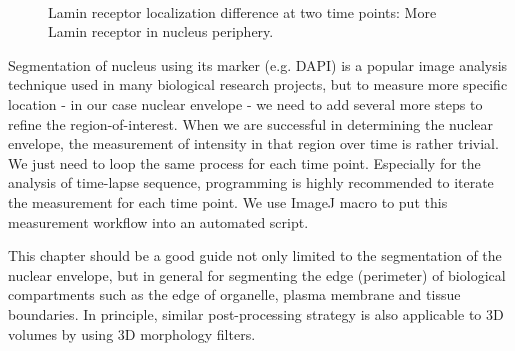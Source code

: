 \begin{figure}[htbp]
 \centering
 \quad
  \\
 \caption{Lamin receptor localization difference at two time points: More Lamin receptor in nucleus periphery. }
 \label{fig:NucStrategy}
\end{figure}

Segmentation of nucleus using its marker (e.g. DAPI) is a popular image analysis technique used in many biological research projects, but to measure more specific location - in our case nuclear envelope - we need to add several more steps to refine the region-of-interest. When we are successful in determining the nuclear envelope, the measurement of intensity in that region over time is rather trivial. We just need to loop the same process for each time point. Especially for the analysis of time-lapse sequence, programming is highly recommended to iterate the measurement for each time point. We use ImageJ macro to put this measurement workflow into an automated script. 

This chapter should be a good guide not only limited to the segmentation of the nuclear envelope, but in general for segmenting the edge (perimeter) of biological compartments such as the edge of organelle, plasma membrane and tissue boundaries. In principle, similar post-processing strategy is also applicable to 3D volumes by using 3D morphology filters. 

